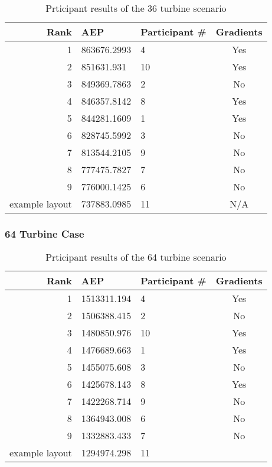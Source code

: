 	\begin{table}[H]
		\begin{center}
			\begin{tabular}{r l l c}
				\hline
				Rank           	& AEP         	& Participant \# & Gradients \\
				\hline
				1				& 863676.2993	& 4				& Yes       \\
				2				& 851631.931	& 10			& Yes       \\
				3				& 849369.7863	& 2             & No        \\
				4				& 846357.8142	& 8             & Yes       \\
				5				& 844281.1609	& 1             & Yes       \\
				6				& 828745.5992	& 3             & No        \\
				7				& 813544.2105	& 9             & No        \\
				8				& 777475.7827	& 7             & No        \\
				9				& 776000.1425	& 6             & No        \\
				example layout	& 737883.0985	& 11            & N/A        \\
				\hline
			\end{tabular}
		\end{center}
		\caption{Prticipant results of the 36 turbine scenario}
		\label{tab:results}
	\end{table}

\subsubsection{64 Turbine Case}

	\begin{table}[H]
		\begin{center}
			\begin{tabular}{r l l c}
				\hline
				Rank           	& AEP         	& Participant \# & Gradients \\
				\hline
				1& 	1513311.194	& 4 & Yes       \\
				2& 	1506388.415	& 2& No        \\
				3&	1480850.976	& 10& Yes       \\
				4&	1476689.663& 1& Yes       \\
				5& 	1455075.608	& 3& No        \\
				6&	1425678.143	& 8& Yes       \\
				7&	1422268.714	& 9& No        \\
				8& 	1364943.008	& 6& No        \\
				9&	1332883.433	& 7& No        \\
				example layout	& 1294974.298&	11 \\
				\hline
			\end{tabular}
		\end{center}
		\caption{Prticipant results of the 64 turbine scenario}
		\label{tab:results}
	\end{table}

